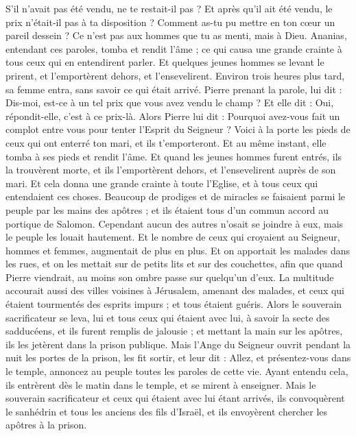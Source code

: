 \begin{multicols}{2}
S’il n’avait pas été vendu, ne te restait-il pas ? Et après qu’il ait été vendu, le prix n’était-il pas à ta disposition ? Comment as-tu pu mettre en ton cœur un pareil dessein ? Ce n’est pas aux hommes que tu as menti, mais à Dieu.
Ananias, entendant ces paroles, tomba et rendit l'âme ; ce qui causa une grande crainte à tous ceux qui en entendirent parler.
Et quelques jeunes hommes se levant le prirent, et l'emportèrent dehors, et l’ensevelirent.
Environ trois heures plus tard, sa femme entra, sans savoir ce qui était arrivé.
Pierre prenant la parole, lui dit : Dis-moi, est-ce à un tel prix que vous avez vendu le champ ? Et elle dit : Oui, répondit-elle, c’est à ce prix-là.
Alors Pierre lui dit : Pourquoi avez-vous fait un complot entre vous pour tenter l'Esprit du Seigneur ? Voici à la porte les pieds de ceux qui ont enterré ton mari, et ils t'emporteront.
Et au même instant, elle tomba à ses pieds et rendit l'âme. Et quand les jeunes hommes furent entrés, ils la trouvèrent morte, et ils l'emportèrent dehors, et l’ensevelirent auprès de son mari.
Et cela donna une grande crainte à toute l'Eglise, et à tous ceux qui entendaient ces choses.
Beaucoup de prodiges et de miracles se faisaient parmi le peuple par les mains des apôtres ; et ils étaient tous d'un commun accord au portique de Salomon.
Cependant aucun des autres n'osait se joindre à eux, mais le peuple les louait hautement.
Et le nombre de ceux qui croyaient au Seigneur, hommes et femmes, augmentait de plus en plus.
Et on apportait les malades dans les rues, et on les mettait sur de petits lits et sur des couchettes, afin que quand Pierre viendrait, au moins son ombre passe sur quelqu'un d'eux.
La multitude accourait aussi des villes voisines à Jérusalem, amenant des malades, et ceux qui étaient tourmentés des esprits impurs ; et tous étaient guéris.
Alors le souverain sacrificateur se leva, lui et tous ceux qui étaient avec lui, à savoir la secte des sadducéens, et ils furent remplis de jalousie ;
et mettant la main sur les apôtres, ils les jetèrent dans la prison publique.
Mais l’Ange du Seigneur ouvrit pendant la nuit les portes de la prison, les fit sortir, et leur dit :
Allez, et présentez-vous dans le temple, annoncez au peuple toutes les paroles de cette vie.
Ayant entendu cela, ils entrèrent dès le matin dans le temple, et se mirent à enseigner. Mais le souverain sacrificateur et ceux qui étaient avec lui étant arrivés, ils convoquèrent le sanhédrin et tous les anciens des fils d'Israël, et ils envoyèrent chercher les apôtres à la prison.

\end{multicols}
